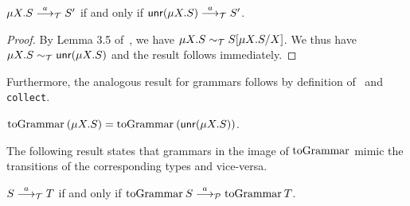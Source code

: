 \begin{lemma}
\label{lemma:unravelling}
$\mu X. S \LTSderives[a] S'$ if and only if $\Unravel (\mu X. S) \LTSderives[a] S'$.
\end{lemma}
\begin{proof}
	By Lemma 3.5 of~\cite{thiemann2016context}, we have
	$\mu X.S \TypeEquiv S[\mu X. S / X]$. We thus have
	$\mu X.S \TypeEquiv \Unravel (\mu X. S)$ and the 
	result follows immediately.
\end{proof}

Furthermore, the analogous result for grammars follows
by definition of \toGrammark\ and \lstinline|collect|.

\begin{lemma}
\label{lemma:unravelling_preserves_grammars}
	$\toGrammarf{(\mu X.S)} = \toGrammarf{(\Unravel (\mu X. S))}$.
\end{lemma}

The following result states that grammars in the image of
$\toGrammark$ mimic the transitions of the corresponding types
and vice-versa.

\begin{proposition}
\label{prop:transitions_mimic}
	$S \LTSderives T$ if and only if 
	$\toGrammarf{S} \LTSderivesP \toGrammarf T$.
\end{proposition}

